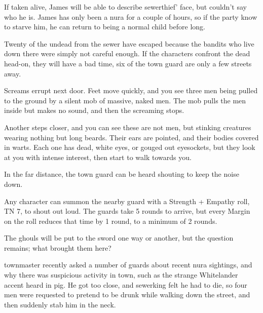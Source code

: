 \begin{multicols}{2}

\deephobgoblin

If taken alive, James will be able to describe \gls{sewerthief}' face, but couldn't say who he is.
James has only been a nura for a couple of hours, so if the party know to starve him, he can return to being a normal child before long.


Twenty of the undead from the sewer have escaped because the bandits who live down there were simply not careful enough.  If the characters confront the dead head-on, they will have a bad time, six of the town guard are only a few streets away.

\begin{boxtext}

	Screams errupt next door.  Feet move quickly, and you see three men being pulled to the ground by a silent mob of massive, naked men.  The mob pulls the men inside but makes no sound, and then the screaming stops.

	Another steps closer, and you can see these are not men, but stinking creatures wearing nothing but long beards.
	Their ears are pointed, and their bodies covered in warts.
	Each one has dead, white eyes, or gouged out eyesockets, but they look at you with intense interest, then start to walk towards you.

	In the far distance, the town guard can be heard shouting to keep the noise down.

\end{boxtext}

Any character can summon the nearby guard with a Strength + Empathy roll, TN 7, to shout out loud.
The guards take 5 rounds to arrive, but every Margin on the roll reduces that time by 1 round, to a minimum of 2 rounds.


The ghouls will be put to the sword one way or another, but the question remains; what brought them here?

\undeadhobgoblin


\gls{townmaster} recently asked a number of guards about recent nura sightings, and why there was suspicious activity in town, such as the strange Whitelander accent heard in \gls{pig}.
He got too close, and \gls{sewerking} felt he had to die, so four men were requested to pretend to be drunk while walking down the street, and then suddenly stab him in the neck.


\end{multicols}
